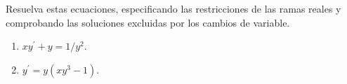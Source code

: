 Resuelva estas ecuaciones, especificando las restricciones de las ramas reales y comprobando las soluciones excluidas por los cambios de variable.

\begin{enumerate}[label=(\alph*),ref=\alph*,leftmargin=*]
\item $xy^{\prime}+y=1/y^2$.
\item $y^{\prime}=y(xy^3-1)$.
\end{enumerate}
